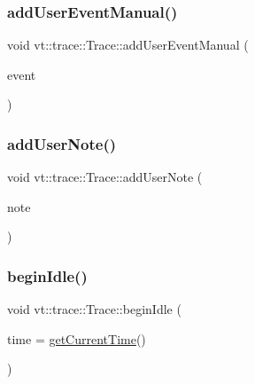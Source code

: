 \subsubsection{\texorpdfstring{add\+User\+Event\+Manual()}{addUserEventManual()}}
{\footnotesize\ttfamily void vt\+::trace\+::\+Trace\+::add\+User\+Event\+Manual (\begin{DoxyParamCaption}\item[{\hyperlink{namespacevt_1_1trace_a70c43e0e1596eea236912d4197d3120a}{User\+Spec\+Event\+I\+D\+Type}}]{event }\end{DoxyParamCaption})}

\mbox{\label{structvt_1_1trace_1_1_trace_a8be5309a84a6d0f99df0eb835fedf3b1}} 
\subsubsection{\texorpdfstring{add\+User\+Note()}{addUserNote()}}
{\footnotesize\ttfamily void vt\+::trace\+::\+Trace\+::add\+User\+Note (\begin{DoxyParamCaption}\item[{std\+::string const \&}]{note }\end{DoxyParamCaption})}

\mbox{\label{structvt_1_1trace_1_1_trace_a530af1b7b48cf389744325f6f7e7f05e}} 
\subsubsection{\texorpdfstring{begin\+Idle()}{beginIdle()}}
{\footnotesize\ttfamily void vt\+::trace\+::\+Trace\+::begin\+Idle (\begin{DoxyParamCaption}\item[{double const}]{time = {\ttfamily \hyperlink{structvt_1_1trace_1_1_trace_a04cf6b76b4ced1bc90d246a34c948db5}{get\+Current\+Time}()} }\end{DoxyParamCaption})}

\mbox{\label{structvt_1_1trace_1_1_trace_a4106e70e0093724a1728dd638ab89d28}} 
